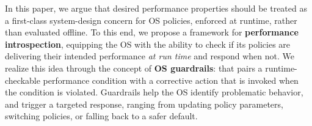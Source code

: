 In this paper, we argue that desired performance properties should be treated as a first-class system-design concern for OS policies, enforced at runtime, rather than evaluated offline. To this end, we propose a framework for {\bf performance introspection}, equipping the OS with the ability to check if its policies are delivering their intended performance {\em at run time} and respond when not. We realize this idea through the concept of {\bf OS guardrails}: that pairs a runtime-checkable performance condition with a corrective action that is invoked when the condition is violated. 
Guardrails help the OS identify problematic behavior, and trigger a targeted response, ranging from updating policy parameters, switching policies, or falling back to a safer default.

    
    
    

